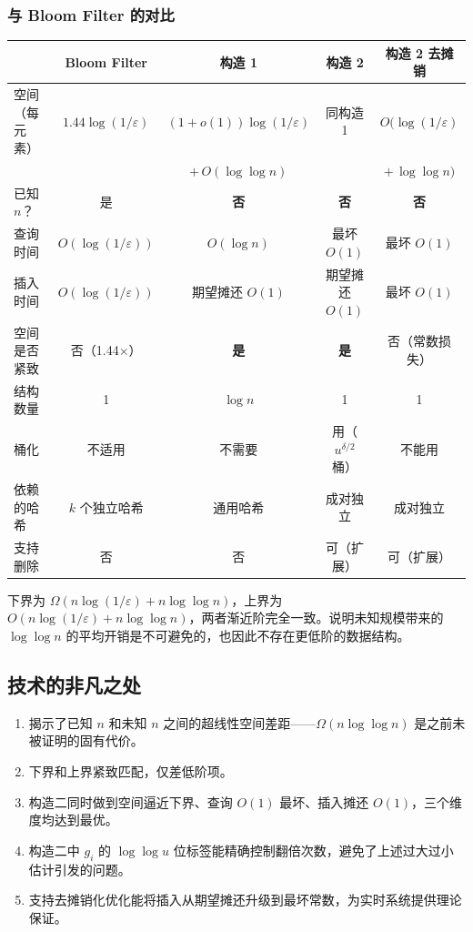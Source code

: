 \documentclass[UTF8,11pt,a4paper]{ctexart}
\begin{document}
\subsubsection{与 Bloom Filter 的对比}

\begin{center}
\footnotesize
\renewcommand{\arraystretch}{1.2}
\setlength{\tabcolsep}{4pt}
\begin{tabular}{|l|c|c|c|c|}
\hline
 & \textbf{Bloom Filter} & \textbf{构造 1} & \textbf{构造 2} & \textbf{构造 2 去摊销} \\
\hline
空间（每元素） & $1.44\log(1/\varepsilon)$ & $(1+o(1))\log(1/\varepsilon)$ & 同构造 1 & $O(\log(1/\varepsilon)$ \\
 & & $+\,O(\log\log n)$ & & $+\,\log\log n)$ \\
\hline
已知 $n$？ & 是 & \textbf{否} & \textbf{否} & \textbf{否} \\
\hline
查询时间 & $O(\log(1/\varepsilon))$ & $O(\log n)$ & 最坏 $O(1)$ & 最坏 $O(1)$ \\
\hline
插入时间 & $O(\log(1/\varepsilon))$ & 期望摊还 $O(1)$ & 期望摊还 $O(1)$ & 最坏 $O(1)$ \\
\hline
空间是否紧致 & 否（1.44$\times$） & \textbf{是} & \textbf{是} & 否（常数损失） \\
\hline
结构数量 & 1 & $\log n$ & 1 & 1 \\
\hline
桶化 & 不适用 & 不需要 & 用（$u^{\delta/2}$ 桶） & 不能用 \\
\hline
依赖的哈希 & $k$ 个独立哈希 & 通用哈希 & 成对独立 & 成对独立 \\
\hline
支持删除 & 否 & 否 & 可（扩展） & 可（扩展） \\
\hline
\end{tabular}
\end{center}

下界为 $\Omega(n\log(1/\varepsilon) + n\log\log n)$，上界为 $O(n\log(1/\varepsilon) + n\log\log n)$，两者渐近阶完全一致。说明未知规模带来的 $\log\log n$ 的平均开销是不可避免的，也因此不存在更低阶的数据结构。

\subsection{技术的非凡之处}

\begin{enumerate}
    \item 揭示了已知 $n$ 和未知 $n$ 之间的超线性空间差距——$\Omega(n\log\log n)$ 是之前未被证明的固有代价。
    \item 下界和上界紧致匹配，仅差低阶项。
    \item 构造二同时做到空间逼近下界、查询 $O(1)$ 最坏、插入摊还 $O(1)$，三个维度均达到最优。
    \item 构造二中 $g_i$ 的 $\log\log u$ 位标签能精确控制翻倍次数，避免了上述过大过小估计引发的问题。
    \item 支持去摊销化优化能将插入从期望摊还升级到最坏常数，为实时系统提供理论保证。
\end{enumerate}
\end{document}
